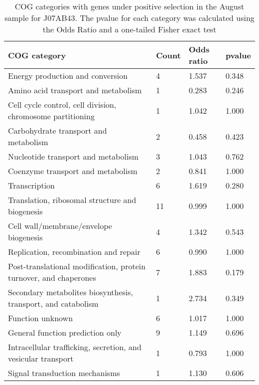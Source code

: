 \begin{table}[hb]
\footnotesize 
	\tabcolsep=0.11cm 
\caption{COG categories with genes under positive selection in the August sample for J07AB43. The pvalue for each category was calculated using the Odds Ratio and a one-tailed Fisher exact test} 
\begin{tabularx}{\textwidth}{L{6cm}R{2cm}R{2cm}R{2cm}} 
\hline 
\textbf{COG category} & \textbf{Count} & \textbf{Odds ratio} & \textbf{pvalue} \\ 
\hline 
Energy production and conversion & 4 & 1.537 & 0.348 \\ 
Amino acid transport and metabolism & 1 & 0.283 & 0.246 \\ 
Cell cycle control, cell division, chromosome partitioning & 1 & 1.042 & 1.000 \\ 
Carbohydrate transport and metabolism & 2 & 0.458 & 0.423 \\ 
Nucleotide transport and metabolism & 3 & 1.043 & 0.762 \\ 
Coenzyme transport and metabolism & 2 & 0.841 & 1.000 \\ 
Transcription & 6 & 1.619 & 0.280 \\ 
Translation, ribosomal structure and biogenesis & 11 & 0.999 & 1.000 \\ 
Cell wall/membrane/envelope biogenesis & 4 & 1.342 & 0.543 \\ 
Replication, recombination and repair & 6 & 0.990 & 1.000 \\ 
Post-translational modification, protein turnover, and chaperones & 7 & 1.883 & 0.179 \\ 
Secondary metabolites biosynthesis, transport, and catabolism & 1 & 2.734 & 0.349 \\ 
Function unknown & 6 & 1.017 & 1.000 \\ 
General function prediction only & 9 & 1.149 & 0.696 \\ 
Intracellular trafficking, secretion, and vesicular transport & 1 & 0.793 & 1.000 \\ 
Signal transduction mechanisms & 1 & 1.130 & 0.606 \\ 
\end{tabularx} 
\label{August_COG_Selection_J07AB43} 
 \end{table} 

